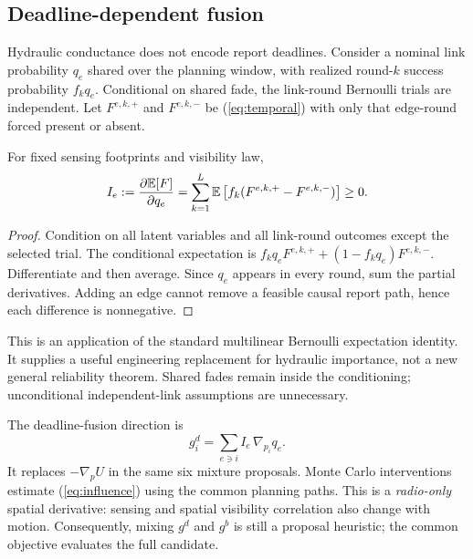 \subsection{Deadline-dependent fusion}
Hydraulic conductance does not encode report deadlines. Consider a nominal
link probability $q_e$ shared over the planning window, with realized round-$k$
success probability $f_kq_e$. Conditional on shared fade, the link-round
Bernoulli trials are independent. Let $F^{e,k,+}$ and $F^{e,k,-}$ be
(\ref{eq:temporal}) with only that edge-round forced present or absent.

\begin{proposition}
For fixed sensing footprints and visibility law,
\begin{equation}
 I_e:=\frac{\partial \mathbb E[F]}{\partial q_e}
 =\sum_{k=1}^{L}\mathbb E\left[f_k
                 (F^{e,k,+}-F^{e,k,-})\right]\geq0.\label{eq:influence}
\end{equation}
\end{proposition}
\begin{proof}
Condition on all latent variables and all link-round outcomes except the
selected trial. The conditional expectation is
$f_kq_eF^{e,k,+}+(1-f_kq_e)F^{e,k,-}$.
Differentiate and then average. Since $q_e$ appears in every round, sum the
partial derivatives. Adding an edge cannot remove a feasible causal report
path, hence each difference is nonnegative.
\end{proof}

This is an application of the standard multilinear Bernoulli expectation
identity. It supplies a useful engineering replacement for hydraulic
importance, not a new general reliability theorem. Shared fades remain inside
the conditioning; unconditional independent-link assumptions are unnecessary.

The deadline-fusion direction is
\begin{equation}
 g^{d}_i=\sum_{e\ni i}I_e\,\nabla_{p_i}q_e.
\end{equation}
It replaces $-\nabla_p U$ in the same six mixture proposals. Monte Carlo
interventions estimate (\ref{eq:influence}) using the common planning paths.
This is a \emph{radio-only} spatial derivative: sensing and spatial visibility
correlation also change with motion. Consequently, mixing $g^d$ and $g^b$ is
still a proposal heuristic; the common objective evaluates the full candidate.

